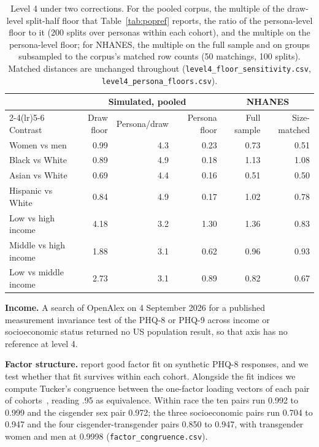 \documentclass[wcp]{jmlr}
\let\cite\citep
\begin{document}
\begin{table}[!htb]
\centering
\caption{Level 4 under two corrections. For the pooled corpus, the multiple of the draw-level split-half floor that Table~\ref{tab:popref} reports, the ratio of the persona-level floor to it (200 splits over personas within each cohort), and the multiple on the persona-level floor; for NHANES, the multiple on the full sample and on groups subsampled to the corpus's matched row counts (50 matchings, 100 splits). Matched distances are unchanged throughout (\texttt{level4\_floor\_sensitivity.csv}, \texttt{level4\_persona\_floors.csv}).}
\label{tab:floorsens}
\scriptsize
\setlength{\tabcolsep}{4pt}
\begin{tabular}{lrrrrr}
\toprule
 & \multicolumn{3}{c}{Simulated, pooled} & \multicolumn{2}{c}{NHANES} \\
\cmidrule(lr){2-4}\cmidrule(lr){5-6}
Contrast & Draw floor & Persona/draw & Persona floor & Full sample & Size-matched \\
\midrule
Women vs men & 0.99 & 4.3 & 0.23 & 0.73 & 0.51 \\
Black vs White & 0.89 & 4.9 & 0.18 & 1.13 & 1.08 \\
Asian vs White & 0.69 & 4.4 & 0.16 & 0.51 & 0.50 \\
Hispanic vs White & 0.84 & 4.9 & 0.17 & 1.02 & 0.78 \\
Low vs high income & 4.18 & 3.2 & 1.30 & 1.36 & 0.83 \\
Middle vs high income & 1.88 & 3.1 & 0.62 & 0.96 & 0.93 \\
Low vs middle income & 2.73 & 3.1 & 0.89 & 0.82 & 0.67 \\
\bottomrule
\end{tabular}
\end{table}

\textbf{Income.} A search of OpenAlex on 4 September 2026 for a published measurement invariance test of the PHQ-8 or PHQ-9 across income or socioeconomic status returned no US population result, so that axis has no reference at level 4.

\textbf{Factor structure.} \citet{villarrealzegarra2026synthetic} report good factor fit on synthetic PHQ-8 responses, and we test whether that fit survives within each cohort. Alongside the fit indices we compute Tucker's congruence between the
one-factor loading vectors of each pair of cohorts~\cite{lorenzoseva2006congruence}, reading .95 as
equivalence. Within race the ten pairs run 0.992 to 0.999 and the cisgender sex pair 0.972; the
three socioeconomic pairs run 0.704 to 0.947 and the four cisgender-transgender pairs 0.850 to
0.947, with transgender women and men at 0.9998 (\texttt{factor\_congruence.csv}).
\end{document}
